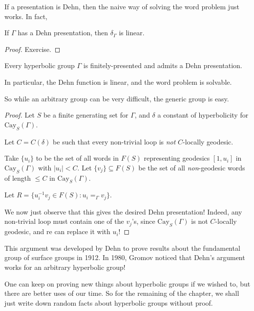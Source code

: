 \documentclass[a4paper]{article}
\newcommand\Cay{\mathrm{Cay}}
\begin{document}
If a presentation is Dehn, then the naive way of solving the word problem just works. In fact,

\begin{lemma}
  If $\Gamma$ has a Dehn presentation, then $\delta_\Gamma$ is linear.
\end{lemma}

\begin{proof}
  Exercise.
\end{proof}

\begin{thm}
  Every hyperbolic group $\Gamma$ is finitely-presented and admits a Dehn presentation.

  In particular, the Dehn function is linear, and the word problem is solvable.
\end{thm}
So while an arbitrary group can be very difficult, the generic group is easy.

\begin{proof}
  Let $S$ be a finite generating set for $\Gamma$, and $\delta$ a constant of hyperbolicity for $\Cay_S(\Gamma)$. 

  Let $C = C(\delta)$ be such that every non-trivial loop is \emph{not} $C$-locally geodesic.

  Take $\{u_i\}$ to be the set of all words in $F(S)$ representing geodesics $[1, u_i]$ in $\Cay_S(\Gamma)$ with $|u_i| < C$. Let $\{v_j\} \subseteq F(S)$ be the set of all \emph{non}-geodesic words of length $\leq C$ in $\Cay_S(\Gamma)$.

  Let $R = \{u_i^{-1} v_j \in F(S) : u_i =_\Gamma v_j\}$.

  We now just observe that this gives the desired Dehn presentation! Indeed, any non-trivial loop must contain one of the $v_j$'s, since $\Cay_S(\Gamma)$ is not $C$-locally geodesic, and re can replace it with $u_i$!
\end{proof}
This argument was developed by Dehn to prove results about the fundamental group of surface groups in 1912. In 1980, Gromov noticed that Dehn's argument works for an arbitrary hyperbolic group!  %

One can keep on proving new things about hyperbolic groups if we wished to, but there are better uses of our time. So for the remaining of the chapter, we shall just write down random facts about hyperbolic groups without proof.
\end{document}
